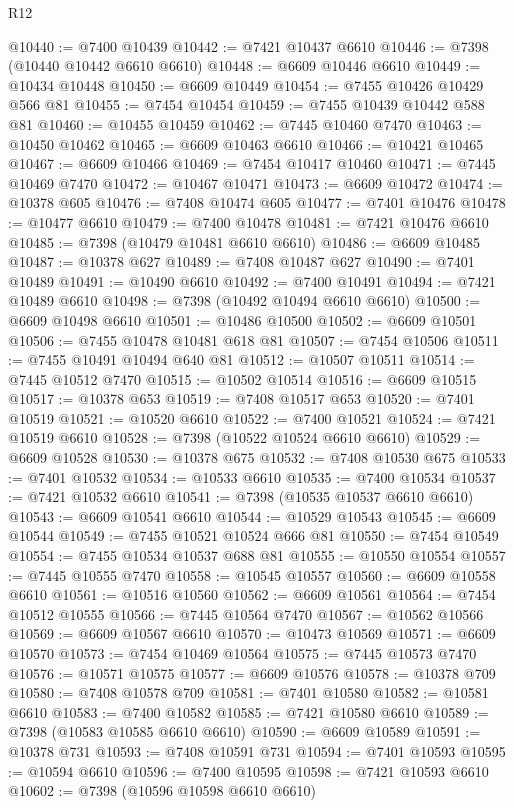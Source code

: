 \begin{lexlean}{R12}
\begin{coremodule}
@10440 := @7400 @10439
@10442 := @7421 @10437 @6610
@10446 := @7398 (@10440 @10442 @6610 @6610)
@10448 := @6609 @10446 @6610
@10449 := @10434 @10448
@10450 := @6609 @10449
@10454 := @7455 @10426 @10429 @566 @81
@10455 := @7454 @10454
@10459 := @7455 @10439 @10442 @588 @81
@10460 := @10455 @10459
@10462 := @7445 @10460 @7470
@10463 := @10450 @10462
@10465 := @6609 @10463 @6610
@10466 := @10421 @10465
@10467 := @6609 @10466
@10469 := @7454 @10417 @10460
@10471 := @7445 @10469 @7470
@10472 := @10467 @10471
@10473 := @6609 @10472
@10474 := @10378 @605
@10476 := @7408 @10474 @605
@10477 := @7401 @10476
@10478 := @10477 @6610
@10479 := @7400 @10478
@10481 := @7421 @10476 @6610
@10485 := @7398 (@10479 @10481 @6610 @6610)
@10486 := @6609 @10485
@10487 := @10378 @627
@10489 := @7408 @10487 @627
@10490 := @7401 @10489
@10491 := @10490 @6610
@10492 := @7400 @10491
@10494 := @7421 @10489 @6610
@10498 := @7398 (@10492 @10494 @6610 @6610)
@10500 := @6609 @10498 @6610
@10501 := @10486 @10500
@10502 := @6609 @10501
@10506 := @7455 @10478 @10481 @618 @81
@10507 := @7454 @10506
@10511 := @7455 @10491 @10494 @640 @81
@10512 := @10507 @10511
@10514 := @7445 @10512 @7470
@10515 := @10502 @10514
@10516 := @6609 @10515
@10517 := @10378 @653
@10519 := @7408 @10517 @653
@10520 := @7401 @10519
@10521 := @10520 @6610
@10522 := @7400 @10521
@10524 := @7421 @10519 @6610
@10528 := @7398 (@10522 @10524 @6610 @6610)
@10529 := @6609 @10528
@10530 := @10378 @675
@10532 := @7408 @10530 @675
@10533 := @7401 @10532
@10534 := @10533 @6610
@10535 := @7400 @10534
@10537 := @7421 @10532 @6610
@10541 := @7398 (@10535 @10537 @6610 @6610)
@10543 := @6609 @10541 @6610
@10544 := @10529 @10543
@10545 := @6609 @10544
@10549 := @7455 @10521 @10524 @666 @81
@10550 := @7454 @10549
@10554 := @7455 @10534 @10537 @688 @81
@10555 := @10550 @10554
@10557 := @7445 @10555 @7470
@10558 := @10545 @10557
@10560 := @6609 @10558 @6610
@10561 := @10516 @10560
@10562 := @6609 @10561
@10564 := @7454 @10512 @10555
@10566 := @7445 @10564 @7470
@10567 := @10562 @10566
@10569 := @6609 @10567 @6610
@10570 := @10473 @10569
@10571 := @6609 @10570
@10573 := @7454 @10469 @10564
@10575 := @7445 @10573 @7470
@10576 := @10571 @10575
@10577 := @6609 @10576
@10578 := @10378 @709
@10580 := @7408 @10578 @709
@10581 := @7401 @10580
@10582 := @10581 @6610
@10583 := @7400 @10582
@10585 := @7421 @10580 @6610
@10589 := @7398 (@10583 @10585 @6610 @6610)
@10590 := @6609 @10589
@10591 := @10378 @731
@10593 := @7408 @10591 @731
@10594 := @7401 @10593
@10595 := @10594 @6610
@10596 := @7400 @10595
@10598 := @7421 @10593 @6610
@10602 := @7398 (@10596 @10598 @6610 @6610)

\end{coremodule}
\end{lexlean}
